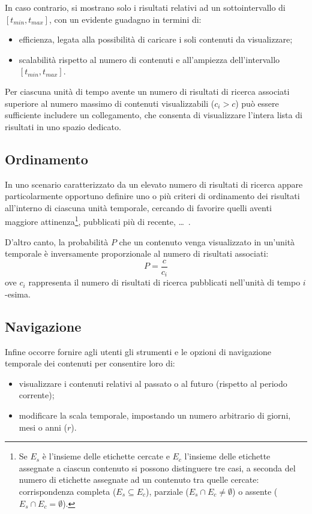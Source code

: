In caso contrario, si mostrano solo i risultati relativi ad un sottointervallo di $[t_{min}, t_{max}]$, con un evidente guadagno in termini di:
\begin{itemize}
  \item efficienza, legata alla possibilità di caricare i soli contenuti da visualizzare;
  \item scalabilità rispetto al numero di contenuti e all'ampiezza dell'intervallo $[t_{min}, t_{max}]$.
\end{itemize}

Per ciascuna unità di tempo avente un numero di risultati di ricerca associati superiore al numero massimo di contenuti visualizzabili ($c_i > c$) può essere sufficiente includere un collegamento, che consenta di visualizzare l'intera lista di risultati in uno spazio dedicato.

\subsection{Ordinamento}
In uno scenario caratterizzato da un elevato numero di risultati di ricerca appare particolarmente opportuno definire uno o più criteri di ordinamento dei risultati all'interno di ciascuna unità temporale, cercando di favorire quelli aventi maggiore attinenza\footnote{Se $E_s$ è l'insieme delle etichette cercate e $E_c$ l'insieme delle etichette assegnate a ciascun contenuto si possono distinguere tre casi, a seconda del numero di etichette assegnate ad un contenuto tra quelle cercate: corrispondenza completa ($E_s \subseteq E_c$), parziale ($E_s \cap E_c \neq \emptyset$) o assente ($E_s \cap E_c = \emptyset$).}, pubblicati più di recente, \ldots\ .

D'altro canto, la probabilità $P$ che un contenuto venga visualizzato in un'unità temporale è inversamente proporzionale al numero di risultati associati:
\begin{equation}
P = \frac{c}{c_i}
\end{equation}
ove $c_i$ rappresenta il numero di risultati di ricerca pubblicati nell'unità di tempo $i$-esima.

\subsection{Navigazione}
Infine occorre fornire agli utenti gli strumenti e le opzioni di navigazione temporale dei contenuti per consentire loro di:
\begin{itemize}
  \item visualizzare i contenuti relativi al passato o al futuro (rispetto al periodo corrente);
  \item modificare la scala temporale, impostando un numero arbitrario di giorni, mesi o anni ($r$).
\end{itemize}


